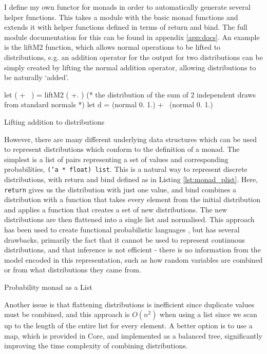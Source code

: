 I define my own functor for monads in order to automatically generate several helper functions. This takes a module with the basic monad functions and extends it with helper functions defined in terms of return and bind. The full module documentation for this can be found in appendix \ref{app:docs}. An example is the liftM2 function, which allows normal operations to be lifted to distributions, e.g. an addition operator for the output for two distributions can be simply created by lifting the normal addition operator, allowing distributions to be naturally `added'.

\begin{listing}
\begin{ocamlcode-in}
let ( +~ ) = liftM2 ( +. )
(* the distribution of the sum of 2 independent draws from standard normals *)
let d = (normal 0. 1.) +~ (normal 0. 1.)
\end{ocamlcode-in}
\caption{Lifting addition to distributions}
\end{listing}

However, there are many different underlying data structures which can be used to represent distributions which conform to the definition of a monad. The simplest is a list of pairs representing a set of values and corresponding probabilities, \texttt{('a * float) list}. This is a natural way to represent discrete distributions, with return and bind defined as in Listing \ref{lst:monad_plist}. Here, \texttt{return} gives us the distribution with just one value, and bind combines a distribution with a function that takes every element from the initial distribution and applies a function that creates a set of new distributions. The new distributions are then flattened into a single list and normalised. This approach has been used to create functional probabilistic languages \cite{erwig}, but has several drawbacks, primarily the fact that it cannot be used to represent continuous distributions, and that inference is not efficient - there is no information from the model encoded in this representation, such as how random variables are combined or from what distributions they came from.

\begin{listing}[!ht]
	\caption{Probability monad as a List}
	\label{lst:monad_plist}
\end{listing}

Another issue is that flattening distributions is inefficient since duplicate values must be combined, and this approach is $O(n^2)$ when using a list since we scan up to the length of the entire list for every element. A better option is to use a map, which is provided in Core, and implemented as a balanced tree, significantly improving the time complexity of combining distributions.

